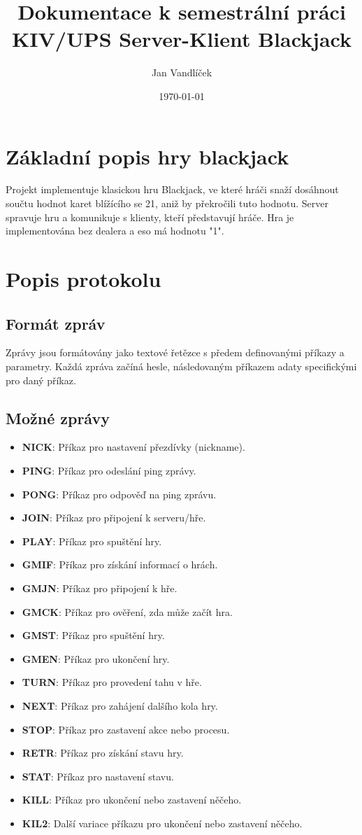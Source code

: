 \documentclass{article}
\title{Dokumentace k semestrální práci KIV/UPS Server-Klient Blackjack}
\author{Jan Vandlíček}
\date{\today}
\begin{document}
\maketitle

\section{Základní popis hry blackjack}
Projekt implementuje klasickou hru Blackjack, ve které hráči snaží dosáhnout součtu hodnot karet blížícího se 21, aniž by překročili tuto hodnotu. Server spravuje hru a komunikuje s klienty, kteří představují hráče. Hra je implementována bez dealera a eso má hodnotu "1".

\section{Popis protokolu}
\subsection{Formát zpráv}
Zprávy jsou formátovány jako textové řetězce s předem definovanými příkazy a parametry. Každá zpráva začíná hesle, následovaným příkazem adaty specifickými pro daný příkaz.

\subsection{Možné zprávy}

\begin{itemize}
    \item \textbf{NICK}: Příkaz pro nastavení přezdívky (nickname).
    \item \textbf{PING}: Příkaz pro odeslání ping zprávy.
    \item \textbf{PONG}: Příkaz pro odpověď na ping zprávu.
    \item \textbf{JOIN}: Příkaz pro připojení k serveru/hře.
    \item \textbf{PLAY}: Příkaz pro spuštění hry.
    \item \textbf{GMIF}: Příkaz pro získání informací o hrách.
    \item \textbf{GMJN}: Příkaz pro připojení k hře.
    \item \textbf{GMCK}: Příkaz pro ověření, zda může začít hra.
    \item \textbf{GMST}: Příkaz pro spuštění hry.
    \item \textbf{GMEN}: Příkaz pro ukončení hry.
    \item \textbf{TURN}: Příkaz pro provedení tahu v hře.
    \item \textbf{NEXT}: Příkaz pro zahájení dalšího kola hry.
    \item \textbf{STOP}: Příkaz pro zastavení akce nebo procesu.
    \item \textbf{RETR}: Příkaz pro získání stavu hry.
    \item \textbf{STAT}: Příkaz pro nastavení stavu.
    \item \textbf{KILL}: Příkaz pro ukončení nebo zastavení něčeho.
    \item \textbf{KIL2}: Další variace příkazu pro ukončení nebo zastavení něčeho.
\end{itemize}
\end{document}
